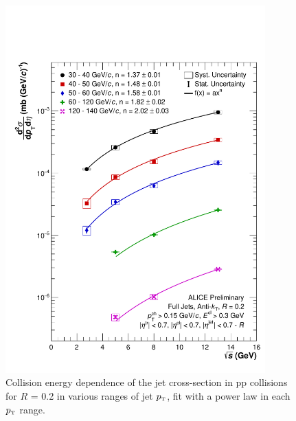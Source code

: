 \documentclass[ALICE]{ALICE_analysis_notes}
\newcommand{\pT}{$p_{\mbox{\tiny T}}$\xspace}
\newcommand{\pp}{pp\xspace}
\begin{document}
\begin{appendix}
\begin{figure}[]
    \includegraphics[width=10cm]{figures/EnergyComparisons/sqrtSComp_R02.pdf}
    \caption{Collision energy dependence of the jet cross-section in \pp collisions for $R$ = 0.2 in various ranges of jet \pT, fit with a power law in each \pT range.}
    \label{fig:appSqrtSCompareR02}
\end{figure}


\end{appendix}
\end{document}
